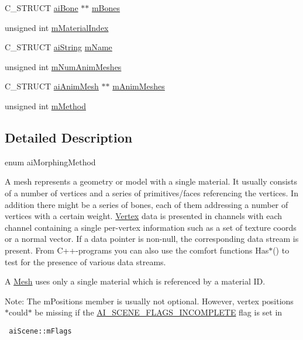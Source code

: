 \begin{CompactItemize}
C\_\-STRUCT \hyperlink{structai_bone}{aiBone} $\ast$$\ast$ \hyperlink{structai_mesh_0c0582a7f45b340b6a33552c53232539}{mBones}
\item 
unsigned int \hyperlink{structai_mesh_a2807c7ba172115203ed16047ad65f9e}{mMaterialIndex}
\item 
C\_\-STRUCT \hyperlink{structai_string}{aiString} \hyperlink{structai_mesh_8dd9433e0c5b008e3e5aee6c801d3b74}{mName}
\item 
unsigned int \hyperlink{structai_mesh_1692a300222b32348ae51779df4a697e}{mNumAnimMeshes}
\item 
C\_\-STRUCT \hyperlink{structai_anim_mesh}{aiAnimMesh} $\ast$$\ast$ \hyperlink{structai_mesh_5078f7db7e99ed05db89dfa412f0e990}{mAnimMeshes}
\item 
unsigned int \hyperlink{structai_mesh_3a6c8c5f1d6543bfdd930f6b07467665}{mMethod}
\end{CompactItemize}


\subsection{Detailed Description}
enum aiMorphingMethod 

A mesh represents a geometry or model with a single material. It usually consists of a number of vertices and a series of primitives/faces referencing the vertices. In addition there might be a series of bones, each of them addressing a number of vertices with a certain weight. \hyperlink{class_vertex}{Vertex} data is presented in channels with each channel containing a single per-vertex information such as a set of texture coords or a normal vector. If a data pointer is non-null, the corresponding data stream is present. From C++-programs you can also use the comfort functions Has$\ast$() to test for the presence of various data streams.

A \hyperlink{class_mesh}{Mesh} uses only a single material which is referenced by a material ID. \begin{Desc}
\item[Note:]The mPositions member is usually not optional. However, vertex positions $\ast$could$\ast$ be missing if the \hyperlink{scene_8h_64c3b662e066126207bb842fc406a745}{AI\_\-SCENE\_\-FLAGS\_\-INCOMPLETE} flag is set in 

\begin{Code}\begin{verbatim} aiScene::mFlags
\end{verbatim}
\end{Code}

 \end{Desc}



